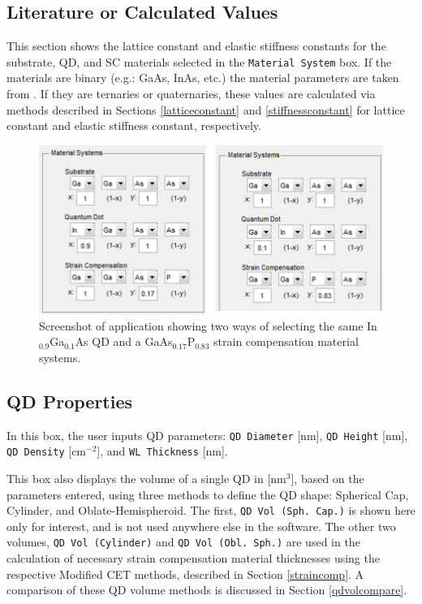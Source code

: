\documentclass{article}
\begin{document}
\subsection{Literature or Calculated Values}
This section shows the lattice constant and elastic stiffness constants for the substrate, QD, and SC materials selected in the \texttt{Material System} box. If the materials are binary (e.g.: GaAs, InAs, etc.) the material parameters are taken from \citeauthor{vurgaftman_band_2001} \cite{vurgaftman_band_2001}. If they are ternaries or quaternaries, these values are calculated via methods described in Sections \ref{latticeconstant} and \ref{stiffnessconstant} for lattice constant and elastic stiffness constant, respectively. 
\begin{figure}
	\includegraphics[width=0.85\linewidth]{scexemat}
	\centering
	\caption{Screenshot of application showing two ways of selecting the same In$_{0.9}$Ga$_{0.1}$As QD and a GaAs$_{0.17}$P$_{0.83}$ strain compensation material systems.}
	\label{fig:scexemat}
\end{figure}

\subsection{QD Properties}
In this box, the user inputs QD parameters: \texttt{QD Diameter} [nm], \texttt{QD Height} [nm], \texttt{QD Density} [cm$^{-2}$], and \texttt{WL Thickness} [nm]. 

This box also displays the volume of a single QD in [nm$^{3}$], based on the parameters entered, using three methods to define the QD shape: Spherical Cap, Cylinder, and Oblate-Hemispheroid. The first, \texttt{QD Vol (Sph. Cap.)} is shown here only for interest, and is not used anywhere else in the software. The other two volumes, \texttt{QD Vol (Cylinder)} and \texttt{QD Vol (Obl. Sph.)} are used in the calculation of necessary strain compensation material thicknesses using the respective Modified CET methods, described in Section \ref{straincomp}. A comparison of these QD volume methods is discussed in Section \ref{qdvolcompare}.
\end{document}
